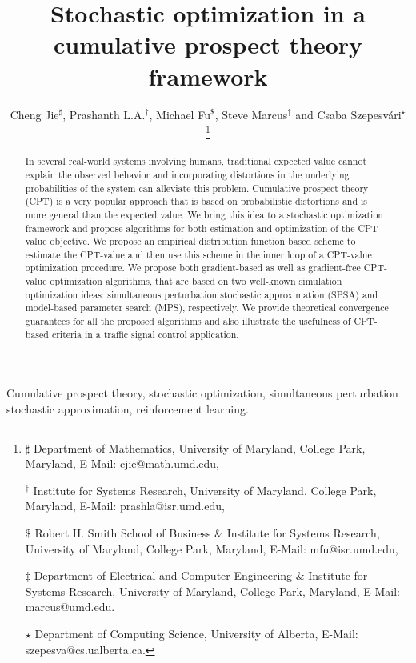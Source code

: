 \documentclass[twocolumn]{IEEEtran}
\begin{document}
\title{Stochastic optimization in a cumulative prospect theory framework}
\author{Cheng Jie$^\sharp$, Prashanth L.A.$^\dagger$, Michael Fu$^\$$, Steve Marcus$^\ddag$ and Csaba Szepesv\'ari$^\star$
\thanks{
$\sharp$ Department of Mathematics,
University of Maryland, College Park, Maryland, 
E-Mail: cjie@math.umd.edu, 

$^\dagger$ Institute for Systems Research, University of Maryland, College Park, Maryland,
E-Mail: prashla@isr.umd.edu,

$\$$ Robert H. Smith School of Business \& Institute for Systems Research,
University of Maryland, College Park, Maryland,
E-Mail: mfu@isr.umd.edu,

$\ddag$ Department of Electrical and Computer Engineering \& Institute for Systems Research,
University of Maryland, College Park, Maryland,
 E-Mail: marcus@umd.edu.

$\star$ Department of Computing Science,
University of Alberta,
 E-Mail: szepesva@cs.ualberta.ca.
}}
\maketitle


\begin{abstract}
In several real-world systems involving humans, traditional expected value cannot explain the observed behavior and incorporating distortions in the underlying probabilities of the system can alleviate this problem. Cumulative prospect theory (CPT) is a very popular approach that is based on probabilistic distortions and is more general than the expected value.  We bring this idea to a stochastic optimization framework and propose algorithms for both estimation and optimization of the CPT-value objective. We propose an empirical distribution function based scheme to estimate the CPT-value and then use this scheme in the inner loop of a CPT-value optimization procedure. We propose both gradient-based as well as gradient-free CPT-value optimization algorithms, that are based on two well-known simulation optimization ideas: simultaneous perturbation stochastic approximation (SPSA) and model-based parameter search (MPS), respectively.  We provide theoretical convergence guarantees for all the proposed algorithms 
and also illustrate the usefulness of CPT-based criteria in a traffic signal control application.
\end{abstract}

\begin{IEEEkeywords}
Cumulative prospect theory, stochastic optimization, simultaneous perturbation stochastic approximation, reinforcement learning.
\end{IEEEkeywords}
\end{document}
